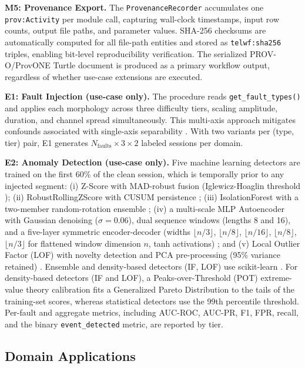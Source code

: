 \documentclass[conference]{IEEEtran}
\begin{document}
\textbf{M5: Provenance Export.} The \texttt{ProvenanceRecorder} accumulates one \texttt{prov:Activity} per module call, capturing wall-clock timestamps, input row counts, output file paths, and parameter values. SHA-256 checksums are automatically computed for all file-path entities and stored as \texttt{telwf:sha256} triples, enabling bit-level reproducibility verification. The serialized PROV-O/ProvONE Turtle document is produced as a primary workflow output, regardless of whether use-case extensions are executed.

\textbf{E1: Fault Injection (use-case only).} The procedure reads \texttt{get\_fault\_types()} and applies each morphology across three difficulty tiers, scaling amplitude, duration, and channel spread simultaneously. This multi-axis approach mitigates confounds associated with single-axis separability \cite{wu2022benchmarks}. With two variants per (type, tier) pair, E1 generates $N_{\text{faults}} \times 3 \times 2$ labeled sessions per domain.

\textbf{E2: Anomaly Detection (use-case only).} Five machine learning detectors are trained on the first 60\% of the clean session, which is temporally prior to any injected segment: (i) Z-Score with MAD-robust fusion (Iglewicz-Hoaglin threshold \cite{iglewicz1993outliers}); (ii) RobustRollingZScore with CUSUM persistence \cite{page1954cusum}; (iii) IsolationForest with a two-member random-rotation ensemble \cite{liu2008isolation}; (iv) a multi-scale MLP Autoencoder with Gaussian denoising ($\sigma\!=\!0.06$), dual sequence windows (lengths 8 and 16), and a five-layer symmetric encoder-decoder (widths $\lfloor n/3\rfloor$, $\lfloor n/8\rfloor$, $\lfloor n/16\rfloor$, $\lfloor n/8\rfloor$, $\lfloor n/3\rfloor$ for flattened window dimension $n$, tanh activations) \cite{sakurada2014autoencoder}; and (v) Local Outlier Factor (LOF) with novelty detection and PCA pre-processing (95\% variance retained) \cite{breunig2000lof}. Ensemble and density-based detectors (IF, LOF) use scikit-learn \cite{pedregosa2011sklearn}. For density-based detectors (IF and LOF), a Peaks-over-Threshold (POT) extreme-value theory calibration \cite{siffer2017evt} fits a Generalized Pareto Distribution to the tails of the training-set scores, whereas statistical detectors use the 99th percentile threshold. Per-fault and aggregate metrics, including AUC-ROC, AUC-PR, F1, FPR, recall, and the binary \texttt{event\_detected} metric, are reported by tier.

\subsection{Domain Applications}
\end{document}
